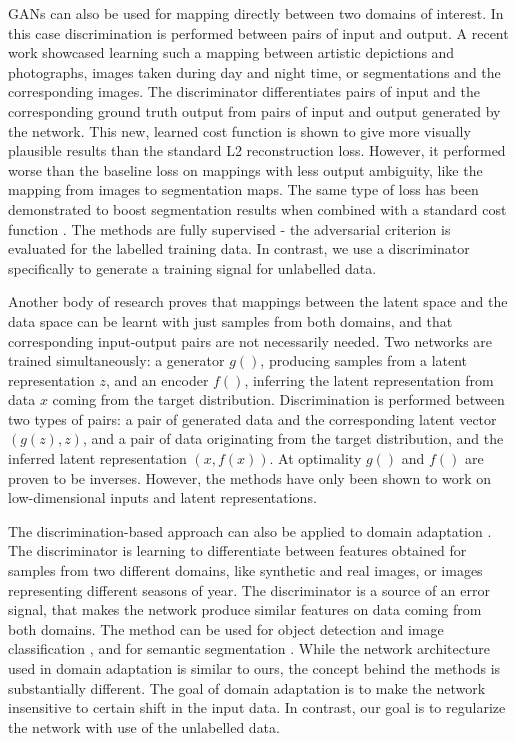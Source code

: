 \documentclass[a4paper]{article}
\begin{document}
GANs can also be used for mapping directly between two domains of interest. In this case discrimination is performed between pairs of input and output. A recent work \cite{pix2pix2016} showcased learning such a mapping between artistic depictions and photographs, images taken during day and night time, or segmentations and the corresponding images. The discriminator differentiates pairs of input and the corresponding ground truth output from pairs of input and output generated by the network. This new, learned cost function is shown to give more visually plausible results than the standard L2 reconstruction loss. However, it performed worse than the baseline loss on mappings with less output ambiguity, like the mapping from images to segmentation maps. The same type of loss has been demonstrated to boost segmentation results when combined with a standard cost function \cite{Luc2016}. The methods are fully supervised - the adversarial criterion is evaluated for the labelled training data. In contrast, we use a discriminator specifically to generate a training signal for unlabelled data.

Another body of research \cite{Donahue2016,ali} proves that mappings between the latent space and the data space can be learnt with just samples from both domains, and that corresponding input-output pairs are not necessarily needed. Two networks are trained simultaneously: a generator $g()$, producing samples from a latent representation $z$, and an encoder $f()$, inferring the latent representation from data $x$ coming from the target distribution. Discrimination is performed between two types of pairs: a pair of generated data and the corresponding latent vector $(g(z),z)$, and a pair of data originating from the target distribution, and the inferred latent representation $(x,f(x))$. At optimality $g()$ and $f()$ are proven to be inverses. However, the methods have only been shown to work on low-dimensional inputs and latent representations. 

The discrimination-based approach can also be applied to domain adaptation \cite{Ganin2015,hoffman2016}. The discriminator is learning to differentiate between features obtained for samples from two different domains, like synthetic and real images, or images representing different seasons of year. The discriminator is a source of an error signal, that makes the network produce similar features on data coming from both domains. 
The method can be used for object detection and image classification \cite{Ganin2015}, and for semantic segmentation \cite{hoffman2016}.
While the network architecture used in domain adaptation is similar to ours, the concept behind the methods is substantially different. The goal of domain adaptation is  to make the network insensitive to certain shift in the input data. In contrast, our goal is to regularize the network with use of the unlabelled data.
\end{document}
